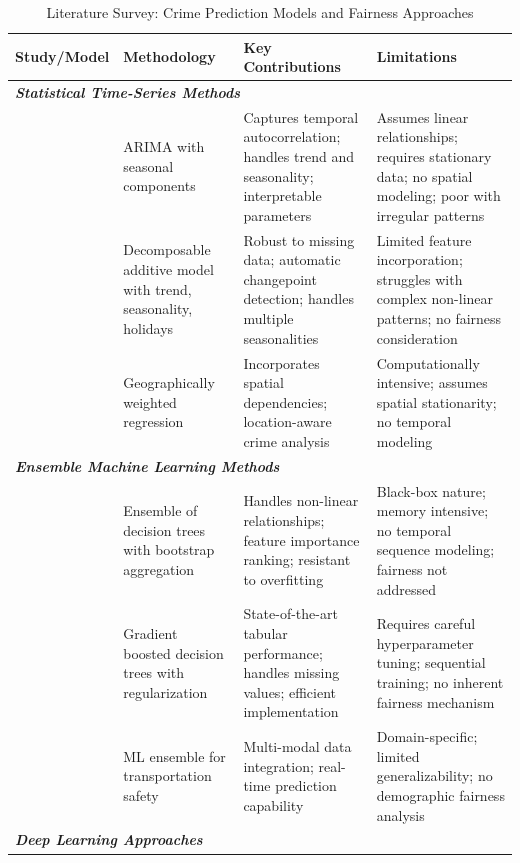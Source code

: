 \documentclass[conference]{IEEEtran}
\begin{document}
\begin{table}[htbp]
\caption{Literature Survey: Crime Prediction Models and Fairness Approaches}
\label{tab:literature_survey}
\centering
\renewcommand{\arraystretch}{1.3}
\begin{tabular}{p{2.2cm}p{2.8cm}p{4.2cm}p{4.2cm}}
\toprule
\textbf{Study/Model} & \textbf{Methodology} & \textbf{Key Contributions} & \textbf{Limitations} \\
\midrule
\multicolumn{4}{l}{\textit{\textbf{Statistical Time-Series Methods}}} \\
\midrule
\cite{box2015time}  & ARIMA with seasonal components & Captures temporal autocorrelation; handles trend and seasonality; interpretable parameters & Assumes linear relationships; requires stationary data; no spatial modeling; poor with irregular patterns \\
\midrule
\cite{taylor2018forecasting} & Decomposable additive model with trend, seasonality, holidays & Robust to missing data; automatic changepoint detection; handles multiple seasonalities & Limited feature incorporation; struggles with complex non-linear patterns; no fairness consideration \\
\midrule
\cite{anselin2000spatial} & Geographically weighted regression & Incorporates spatial dependencies; location-aware crime analysis & Computationally intensive; assumes spatial stationarity; no temporal modeling \\
\midrule
\multicolumn{4}{l}{\textit{\textbf{Ensemble Machine Learning Methods}}} \\
\midrule
\cite{breiman2001random} & Ensemble of decision trees with bootstrap aggregation & Handles non-linear relationships; feature importance ranking; resistant to overfitting & Black-box nature; memory intensive; no temporal sequence modeling; fairness not addressed \\
\midrule
\cite{chen2016xgboost} & Gradient boosted decision trees with regularization & State-of-the-art tabular performance; handles missing values; efficient implementation & Requires careful hyperparameter tuning; sequential training; no inherent fairness mechanism \\
\midrule
\cite{catlett2020transportation} & ML ensemble for transportation safety & Multi-modal data integration; real-time prediction capability & Domain-specific; limited generalizability; no demographic fairness analysis \\
\midrule
\multicolumn{4}{l}{\textit{\textbf{Deep Learning Approaches}}} \\

\end{tabular}
\end{table}
\end{document}
